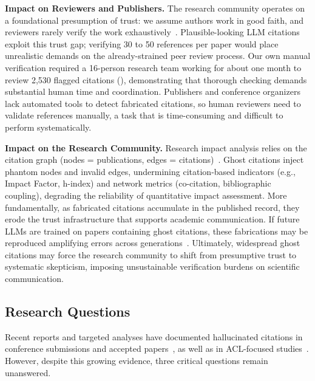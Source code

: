 \noindent
\textbf{Impact on Reviewers and Publishers.}
The research community operates on a foundational presumption of trust: we assume authors work in good faith, and reviewers rarely verify the work exhaustively~\cite{smith2006peer}.
Plausible-looking LLM citations exploit this trust gap; verifying 30 to 50 references per paper would place unrealistic demands on the already-strained peer review process.
Our own manual verification required a 16-person research team working for about one month to review 2,530 flagged citations (), demonstrating that thorough checking demands substantial human time and coordination.
Publishers and conference organizers lack automated tools to detect fabricated citations, so human reviewers need to validate references manually, a task that is time-consuming and difficult to perform systematically.

\noindent
\textbf{Impact on the Research Community.}
Research impact analysis relies on the citation graph (nodes = publications, edges = citations)~\cite{newman2001structure}.
Ghost citations inject phantom nodes and invalid edges, undermining citation-based indicators (e.g., Impact Factor, h-index) and network metrics (co-citation, bibliographic coupling), degrading the reliability of quantitative impact assessment.
More fundamentally, as fabricated citations accumulate in the published record, they erode the trust infrastructure that supports academic communication.
If future LLMs are trained on papers containing ghost citations, these fabrications may be reproduced amplifying errors across generations~\cite{shumailov2024ai}.
Ultimately, widespread ghost citations may force the research community to shift from presumptive trust to systematic skepticism, imposing unsustainable verification burdens on scientific communication.



\subsection{Research Questions}
\label{sec:research_gap}

Recent reports and targeted analyses have documented hallucinated citations in conference submissions and accepted papers~\cite{gptzero2026iclr,gptzero2025nips}, as well as in ACL-focused studies~\cite{sakai2026hallucitation}. However, despite this growing evidence, three critical questions remain unanswered.


